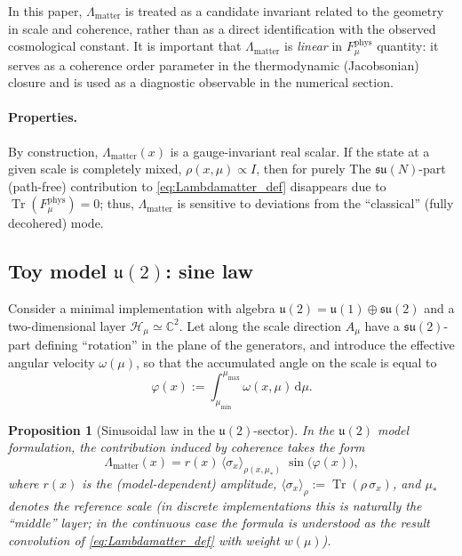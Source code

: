 \documentclass[11pt,a4paper]{article}
\DeclareMathOperator{\Tr}{Tr}
\newcommand{\dd}{\mathrm{d}}
\theoremstyle{definition}
\theoremstyle{plain}
\newtheorem{proposition}{Proposition}[section]
\theoremstyle{remark}
\begin{document}
In this paper, $\Lambda_{\mathrm{matter}}$ is treated as a candidate invariant related to the geometry in scale and coherence, rather than as a direct identification with the observed cosmological constant.
It is important that $\Lambda_{\mathrm{matter}}$ is \emph{linear} in $F_\mu^{\mathrm{phys}}$ quantity:
it serves as a coherence order parameter in the thermodynamic (Jacobsonian) closure
and is used as a diagnostic observable in the numerical section.

\paragraph{Properties.}
By construction, $\Lambda_{\mathrm{matter}}(x)$ is a gauge-invariant real scalar.
If the state at a given scale is completely mixed, $\rho(x,\mu)\propto I$, then for purely The $\mathfrak{su}(N)$-part
(path-free) contribution to \eqref{eq:Lambdamatter_def} disappears due to $\Tr(F_{\mu}^{\mathrm{phys}})=0$;
thus, $\Lambda_{\mathrm{matter}}$ is sensitive to deviations from the “classical” (fully decohered) mode.

\subsection[Toy model u(2): sine law]{Toy model $\mathfrak{u}(2)$: sine law}
\label{sec:theory:sinlaw}

Consider a minimal implementation with algebra $\mathfrak{u}(2)=\mathfrak{u}(1)\oplus\mathfrak{su}(2)$ and
a two-dimensional layer $\mathcal H_\mu\simeq\mathbb C^2$.
Let along the scale direction $A_\mu$ have a $\mathfrak{su}(2)$-part defining “rotation” in the plane of the generators,
and introduce the effective angular velocity $\omega(\mu)$, so that the accumulated angle on the scale is equal to
\begin{equation}\label{eq:phi_total}
\varphi(x) := \int_{\mu_{\min}}^{\mu_{\max}}\omega(x,\mu)\,\dd\mu.
\end{equation}

\begin{proposition}[Sinusoidal law in the $\mathfrak{u}(2)$-sector]\label{prop:sinlaw}
In the $\mathfrak{u}(2)$ model formulation, the contribution induced by coherence takes the form
\begin{equation}\label{eq:sinlaw}
\Lambda_{\mathrm{matter}}(x)
=
r(x)\,\langle \sigma_x\rangle_{\rho(x,\mu_\ast)}\;
\sin\!\bigl(\varphi(x)\bigr),
\end{equation}
where $r(x)$ is the (model-dependent) amplitude,
$\langle \sigma_x\rangle_{\rho} := \Tr(\rho\,\sigma_x)$, and $\mu_\ast$ denotes the reference scale
(in discrete implementations this is naturally the “middle” layer; in the continuous case the formula is understood as the result
convolution of \eqref{eq:Lambdamatter_def} with weight $w(\mu)$).
\end{proposition}
\end{document}

